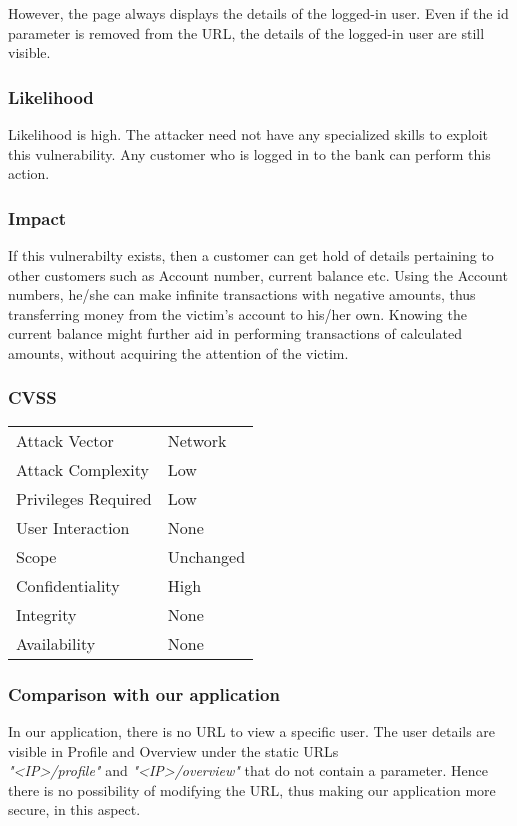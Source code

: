 However, the page always displays the details of the logged-in user. 
Even if the id parameter is removed from the URL, the details of the logged-in user are still visible.

\subsubsection{Likelihood}
Likelihood is high.
The attacker need not have any specialized skills to exploit this vulnerability. Any customer who is logged in to the bank can perform this action. 

\subsubsection{Impact}
If this vulnerabilty exists, then a customer can get hold of details pertaining to other customers such as Account number, current balance etc. Using the Account numbers, he/she can make infinite transactions with negative amounts, thus transferring money from the victim's account to his/her own. Knowing the current balance might further aid in performing transactions of calculated amounts, without acquiring the attention of the victim. 

\subsubsection{CVSS}
\begin{tabular}{l | l}
Attack Vector		& Network \\
Attack Complexity	& Low \\
Privileges Required & Low \\
User Interaction	& None \\
Scope				& Unchanged \\
Confidentiality		& High \\
Integrity			& None \\
Availability		& None
\end{tabular}

\subsubsection{Comparison with our application}
In our application, there is no URL to view a specific user. The user details are visible in Profile and Overview under the static URLs \\ 
\textit{"<IP>/profile"} and \textit{"<IP>/overview"} that do not contain a parameter. Hence there is no possibility of modifying the URL, thus making our application more secure, in this aspect.
\clearpage